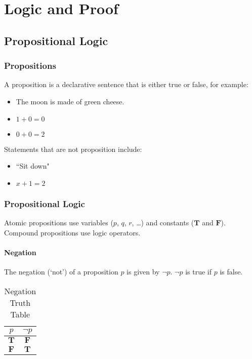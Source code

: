 \chapter{Logic and Proof}

\section{Propositional Logic}

\subsection{Propositions}
A proposition is a declarative sentence that is either true or false, for example:
\begin{itemize}
    \item The moon is made of green cheese.
    \item \(1 + 0 = 0\)
    \item \(0 + 0 = 2\)
\end{itemize}
Statements that are not proposition include:
\begin{itemize}
    \item ``Sit down"
    \item \(x + 1 = 2\)
\end{itemize}

\subsection{Propositional Logic}
Atomic propositions use variables (\(p\), \(q\), \(r\), \dots) and constants (\(\mathbf{T}\) and \(\mathbf{F}\)). Compound propositions use logic operators.

\subsubsection{Negation}
The negation (`not') of a proposition \(p\) is given by \(\neg p\). \(\neg p\) is true if \(p\) is false.

\begin{table}[htbp]
    \centering
    \begin{tabular}{cc}
        \toprule
        \(p\)          & \(\neg p\)     \\
        \midrule
        \(\mathbf{T}\) & \(\mathbf{F}\) \\
        \(\mathbf{F}\) & \(\mathbf{T}\) \\
        \bottomrule
    \end{tabular}
    \caption{Negation Truth Table}
\end{table}

